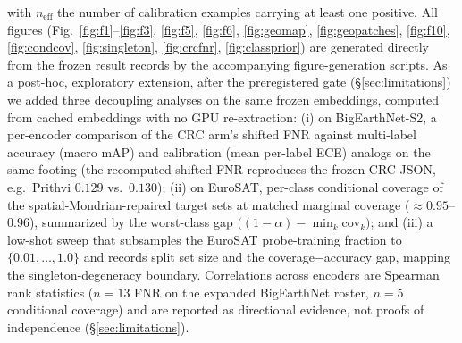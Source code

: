 \documentclass[journal]{IEEEtran}
\renewcommand{\_}{\textunderscore\allowbreak}
\begin{document}
with $n_{\mathrm{eff}}$ the number of calibration examples carrying at least one positive.
All figures (Fig.~\ref{fig:f1}--\ref{fig:f3}, \ref{fig:f5}, \ref{fig:f6},
\ref{fig:geomap}, \ref{fig:geopatches}, \ref{fig:f10}, \ref{fig:condcov},
\ref{fig:singleton}, \ref{fig:crcfnr}, \ref{fig:classprior}) are generated directly from the
frozen result records by the accompanying figure-generation scripts.
As a post-hoc, exploratory extension, after the preregistered gate
(\S\ref{sec:limitations}) we added three decoupling analyses on the same frozen embeddings, computed
from cached embeddings with no GPU re-extraction: (i) on BigEarthNet-S2, a per-encoder comparison
of the CRC arm's shifted FNR against multi-label accuracy (macro mAP) and calibration (mean per-label
ECE) analogs on the same footing (the recomputed shifted FNR reproduces the frozen CRC JSON, e.g.\ Prithvi
$0.129$ vs.\ $0.130$); (ii) on EuroSAT, per-class conditional coverage of the spatial-Mondrian-repaired
target sets at matched marginal coverage ($\approx0.95$--$0.96$), summarized by the worst-class gap
$\big((1{-}\alpha)-\min_k \mathrm{cov}_k\big)$; and (iii) a low-shot sweep that subsamples the
EuroSAT probe-training fraction to $\{0.01,\dots,1.0\}$ and records split set size and the
coverage$-$accuracy gap, mapping the singleton-degeneracy boundary. Correlations across encoders are
Spearman rank statistics ($n{=}13$ FNR on the expanded BigEarthNet roster, $n{=}5$ conditional coverage)
and are reported as directional evidence, not proofs of independence (\S\ref{sec:limitations}).
\end{document}

